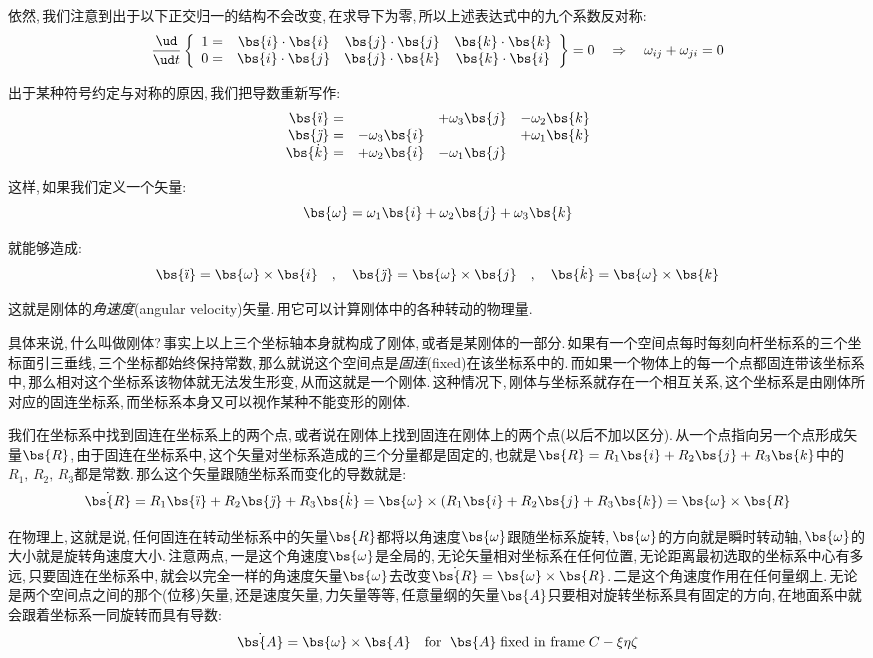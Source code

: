 依然,\,我们注意到出于以下正交归一的结构不会改变,\,在求导下为零,\,所以上述表达式中的九个系数反对称:
\[\frac{\ud}{\ud t}\left\{\begin{array}{cccc}
1= 	&\bs{i}\cdot\bs{i} 	&\bs{j}\cdot\bs{j} 	&\bs{k}\cdot\bs{k} 	\\
0= 	&\bs{i}\cdot\bs{j} 	&\bs{j}\cdot\bs{k} 	&\bs{k}\cdot\bs{i}
\end{array}\right\}=0\quad \Rightarrow \quad\omega_{ij}+\omega_{ji}=0\]

出于某种符号约定与对称的原因,\,我们把导数重新写作:
\[\begin{array}{rlll}
\bs{\ddot{\imath}}=		&									 	&	+\omega_3\bs{j} 				& -\omega_2\bs{k}\\
\bs{\ddot{\jmath}}=		&	-\omega_3\bs{i} 			&									 		& +\omega_1\bs{k}\\
\bs{\dot{k}}=				&	+\omega_2\bs{i} 			&	-\omega_1\bs{j} 				& 
\end{array}\]

这样,\,如果我们定义一个矢量:
\[\bs{\omega}=\omega_1\bs{i}+\omega_2\bs{j}+\omega_3\bs{k}\]

就能够造成:
\[\bs{\ddot{\imath}}=\bs{\omega}\times \bs{i}\quad ,\quad \bs{\ddot{\jmath}}=\bs{\omega}\times \bs{j}\quad ,\quad \bs{\dot{k}}=\bs{\omega}\times \bs{k}\]

这就是刚体的\emph{角速度}(angular velocity)矢量.\,用它可以计算刚体中的各种转动的物理量.

具体来说,\,什么叫做刚体?\,事实上以上三个坐标轴本身就构成了刚体,\,或者是某刚体的一部分.\,如果有一个空间点每时每刻向杆坐标系的三个坐标面引三垂线,\,三个坐标都始终保持常数,\,那么就说这个空间点是\emph{固连}(fixed)在该坐标系中的.\,而如果一个物体上的每一个点都固连带该坐标系中,\,那么相对这个坐标系该物体就无法发生形变,\,从而这就是一个刚体.\,这种情况下,\,刚体与坐标系就存在一个相互关系,\,这个坐标系是由刚体所对应的固连坐标系,\,而坐标系本身又可以视作某种不能变形的刚体.

我们在坐标系中找到固连在坐标系上的两个点,\,或者说在刚体上找到固连在刚体上的两个点(以后不加以区分).\,从一个点指向另一个点形成矢量$\bs{R}$,\,由于固连在坐标系中,\,这个矢量对坐标系造成的三个分量都是固定的,\,也就是$\bs{R}=R_1\bs{i}+R_2\bs{j}+R_3\bs{k}$中的$R_1,\,R_2,\,R_3$都是常数.\,那么这个矢量跟随坐标系而变化的导数就是:
\[\dot{\bs{R}}=R_1\bs{\ddot{\imath}}+R_2\bs{\ddot{\jmath}}+R_3\bs{\dot{k}}=\bs{\omega}\times(R_1\bs{i}+R_2\bs{j}+R_3\bs{k})=\bs{\omega}\times\bs{R}\]

在物理上,\,这就是说,\,任何固连在转动坐标系中的矢量$\bs{R}$都将以角速度$\bs{\omega}$跟随坐标系旋转,\,$\bs{\omega}$的方向就是瞬时转动轴,\,$\bs{\omega}$的大小就是旋转角速度大小.\,注意两点,\,一是这个角速度$\bs{\omega}$是全局的,\,无论矢量相对坐标系在任何位置,\,无论距离最初选取的坐标系中心有多远,\,只要固连在坐标系中,\,就会以完全一样的角速度矢量$\bs{\omega}$去改变$\dot{\bs{R}}=\bs{\omega}\times\bs{R}$.\,二是这个角速度作用在任何量纲上.\,无论是两个空间点之间的那个(位移)矢量,\,还是速度矢量,\,力矢量等等,\,任意量纲的矢量$\bs{A}$只要相对旋转坐标系具有固定的方向,\,在地面系中就会跟着坐标系一同旋转而具有导数:
\[\dot{\bs{A}}=\bs{\omega}\times\bs{A}\quad \text{for }\; \bs{A}\;\text{fixed in frame}\; C-\xi\eta\zeta\]

